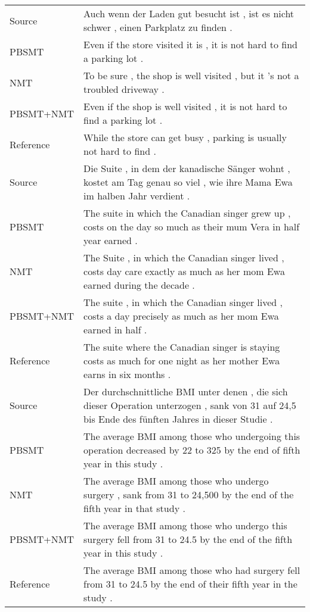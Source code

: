 \documentclass[11pt,a4paper]{article}
\begin{document}
{\begin{table*}[p]
{\begin{tabular}{ll}
        Source    & Auch wenn der Laden gut besucht ist , ist es nicht schwer , einen Parkplatz zu finden . \\
        PBSMT     & Even if the store visited it is , it is not hard to find a parking lot . \\
        NMT       & To be sure , the shop is well visited , but it 's not a troubled driveway . \\
        PBSMT+NMT & Even if the shop is well visited , it is not hard to find a parking lot . \\
        Reference & While the store can get busy , parking is usually not hard to find . \\
    
        \midrule
    
        Source    & Die Suite , in dem der kanadische Sänger wohnt , kostet am Tag genau so viel , wie ihre Mama Ewa im halben Jahr verdient . \\
        PBSMT     & The suite in which the Canadian singer grew up , costs on the day so much as their mum Vera in half year earned . \\
        NMT       & The Suite , in which the Canadian singer lived , costs day care exactly as much as her mom Ewa earned during the decade . \\
        PBSMT+NMT & The suite , in which the Canadian singer lived , costs a day precisely as much as her mom Ewa earned in half . \\
        Reference & The suite where the Canadian singer is staying costs as much for one night as her mother Ewa earns in six months . \\
    
        \midrule
    
        Source    & Der durchschnittliche BMI unter denen , die sich dieser Operation unterzogen , sank von 31 auf 24,5 bis Ende des fünften Jahres in dieser Studie . \\
        PBSMT     & The average BMI among those who undergoing this operation decreased by 22 to 325 by the end of fifth year in this study . \\
        NMT       & The average BMI among those who undergo surgery , sank from 31 to 24,500 by the end of the fifth year in that study . \\
        PBSMT+NMT & The average BMI among those who undergo this surgery fell from 31 to 24.5 by the end of the fifth year in this study . \\
        Reference & The average BMI among those who had surgery fell from 31 to 24.5 by the end of their fifth year in the study . \\
    

\end{tabular}}
\end{table*}}
\end{document}
